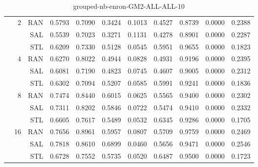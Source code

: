 \begin{center}
\begin{table}[htbp]
\begin{tabular}{ | r | r | r | r | r | r | r | r | r | r | r |}
 & \multirow{3}{*}{2} & RAN & 0.5793 & 0.7090 & 0.3424 & 0.1013 & 0.4527 & 0.8739 & 0.0000 & 0.2388\\ \cline{3-11}
 &   & SAL & 0.5539 & 0.7023 & 0.3271 & 0.1131 & 0.4278 & 0.8901 & 0.0000 & 0.2287\\ \cline{3-11}
 &   & STL & 0.6209 & 0.7330 & 0.5128 & 0.0545 & 0.5951 & 0.9655 & 0.0000 & 0.1823\\ \cline{2-11}
 & \multirow{3}{*}{4} & RAN & 0.6270 & 0.8022 & 0.4944 & 0.0828 & 0.4931 & 0.9196 & 0.0000 & 0.2395\\ \cline{3-11}
 &   & SAL & 0.6081 & 0.7190 & 0.4823 & 0.0745 & 0.4607 & 0.9005 & 0.0000 & 0.2312\\ \cline{3-11}
 &   & STL & 0.6302 & 0.7094 & 0.5207 & 0.0585 & 0.5991 & 0.9241 & 0.0000 & 0.1836\\ \cline{2-11}
 & \multirow{3}{*}{8} & RAN & 0.7474 & 0.8440 & 0.6015 & 0.0625 & 0.5565 & 0.9400 & 0.0000 & 0.2302\\ \cline{3-11}
 &   & SAL & 0.7311 & 0.8202 & 0.5846 & 0.0722 & 0.5474 & 0.9410 & 0.0000 & 0.2332\\ \cline{3-11}
 &   & STL & 0.6605 & 0.7617 & 0.5489 & 0.0532 & 0.6345 & 0.9286 & 0.0000 & 0.1705\\ \cline{2-11}
 & \multirow{3}{*}{16} & RAN & 0.7656 & 0.8961 & 0.5957 & 0.0807 & 0.5709 & 0.9759 & 0.0000 & 0.2469\\ \cline{3-11}
 &   & SAL & 0.7818 & 0.8610 & 0.6899 & 0.0460 & 0.5656 & 0.9471 & 0.0000 & 0.2546\\ \cline{3-11}
 &   & STL & 0.6728 & 0.7552 & 0.5735 & 0.0520 & 0.6487 & 0.9500 & 0.0000 & 0.1723\\ \cline{2-11}
\hline
\end{tabular}
\caption{grouped-nb-enron-GM2-ALL-ALL-10}
\end{table}
\end{center}

